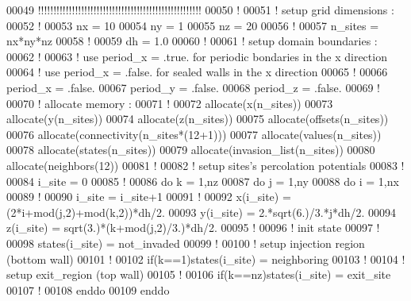 \begin{DoxyCode}
00049 \textcolor{comment}{!!!!!!!!!!!!!!!!!!!!!!!!!!!!!!!!!!!!!!!!!!!!!!!!!!!!!}
00050 \textcolor{comment}{!}
00051 \textcolor{comment}{! setup grid dimensions :}
00052 \textcolor{comment}{!}
00053 nx = 10
00054 ny = 1
00055 nz = 20
00056 \textcolor{comment}{!}
00057 n\_sites = nx*ny*nz
00058 \textcolor{comment}{!}
00059 dh = 1.0
00060 \textcolor{comment}{!}
00061 \textcolor{comment}{! setup domain boundaries : }
00062 \textcolor{comment}{!}
00063 \textcolor{comment}{! use period\_x = .true. for periodic bondaries in the x direction}
00064 \textcolor{comment}{! use period\_x = .false. for sealed walls in the x direction}
00065 \textcolor{comment}{!}
00066 period\_x = .false.
00067 period\_y = .false.
00068 period\_z = .false.
00069 \textcolor{comment}{!}
00070 \textcolor{comment}{! allocate memory :}
00071 \textcolor{comment}{!}
00072 \textcolor{keyword}{allocate}(x(n\_sites))
00073 \textcolor{keyword}{allocate}(y(n\_sites))
00074 \textcolor{keyword}{allocate}(z(n\_sites))
00075 \textcolor{keyword}{allocate}(offsets(n\_sites))
00076 \textcolor{keyword}{allocate}(connectivity(n\_sites*(12+1)))
00077 \textcolor{keyword}{allocate}(values(n\_sites))
00078 \textcolor{keyword}{allocate}(states(n\_sites))
00079 \textcolor{keyword}{allocate}(invasion\_list(n\_sites))
00080 \textcolor{keyword}{allocate}(neighbors(12))
00081 \textcolor{comment}{!}
00082 \textcolor{comment}{! setup sites's percolation potentials}
00083 \textcolor{comment}{!}
00084 i\_site = 0
00085 \textcolor{comment}{!}
00086 \textcolor{keyword}{do} k = 1,nz
00087    \textcolor{keyword}{do} j = 1,ny
00088       \textcolor{keyword}{do} i = 1,nx
00089          \textcolor{comment}{!}
00090          i\_site = i\_site+1
00091          \textcolor{comment}{!}
00092          x(i\_site) = (2*i+mod(j,2)+mod(k,2))*dh/2.
00093          y(i\_site) = 2.*sqrt(6.)/3.*j*dh/2.
00094          z(i\_site) = sqrt(3.)*(k+mod(j,2)/3.)*dh/2.
00095          \textcolor{comment}{!}
00096          \textcolor{comment}{! init state}
00097          \textcolor{comment}{!}
00098          states(i\_site) = not\_invaded
00099          \textcolor{comment}{!}
00100          \textcolor{comment}{! setup injection region (bottom wall)}
00101          \textcolor{comment}{!}
00102          \textcolor{keyword}{if}(k==1)states(i\_site) = neighboring
00103          \textcolor{comment}{!}
00104          \textcolor{comment}{! setup exit\_region (top wall)}
00105          \textcolor{comment}{!}
00106          \textcolor{keyword}{if}(k==nz)states(i\_site) = exit\_site
00107          \textcolor{comment}{!}
00108       \textcolor{keyword}{enddo}
00109    \textcolor{keyword}{enddo}

\end{DoxyCode}
